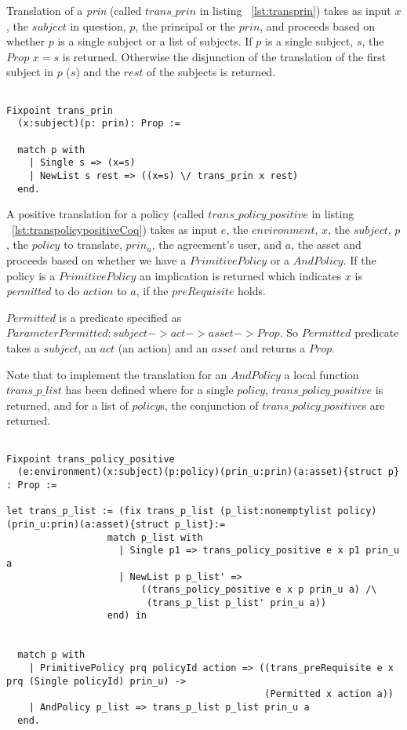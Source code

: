 Translation of a \emph{prin} (called $trans\_prin$ in listing ~\ref{lst:transprin}) takes as input $x$, the $subject$ in question, $p$, the principal or the $prin$,  and proceeds based on whether $p$ is a single subject or a list of subjects. If $p$ is a single subject, $s$, the $Prop$ $x=s$ is returned. Otherwise the disjunction of the translation of the first subject in $p$ ($s$) and the $rest$ of the subjects is returned.

\begin{lstlisting}

Fixpoint trans_prin
  (x:subject)(p: prin): Prop :=

  match p with
    | Single s => (x=s)
    | NewList s rest => ((x=s) \/ trans_prin x rest)
  end.
\end{lstlisting}


A positive translation for a policy (called $trans\_policy\_positive$ in listing ~\ref{lst:transpolicypositiveCoq}) takes as input $e$, the $environment$, $x$, the $subject$, $p$, the $policy$ to translate, $prin_{u}$, the agreement's user, and $a$, the asset and proceeds based on whether we have a $PrimitivePolicy$ or a $AndPolicy$. If the policy is a $PrimitivePolicy$ an implication is returned which indicates $x$ is \emph{permitted} to do $action$ to $a$, if the $preRequisite$ holds. 

$Permitted$ is a predicate specified as $Parameter Permitted : subject -> act -> asset -> Prop.$ So $Permitted$ predicate takes a $subject$, an $act$ (an action) and an $asset$ and returns a $Prop$. 

Note that to implement the translation for an $AndPolicy$ a local function $trans\_p\_list$ has been defined where for a single $policy$, $trans\_policy\_positive$ is returned, and for a list of $policy$s, the conjunction of $trans\_policy\_positive$s are returned.

\begin{lstlisting}

Fixpoint trans_policy_positive
  (e:environment)(x:subject)(p:policy)(prin_u:prin)(a:asset){struct p} : Prop :=

let trans_p_list := (fix trans_p_list (p_list:nonemptylist policy)(prin_u:prin)(a:asset){struct p_list}:=
                  match p_list with
                    | Single p1 => trans_policy_positive e x p1 prin_u a
                    | NewList p p_list' => 
                        ((trans_policy_positive e x p prin_u a) /\ 
                         (trans_p_list p_list' prin_u a))
                  end) in


  match p with
    | PrimitivePolicy prq policyId action => ((trans_preRequisite e x prq (Single policyId) prin_u) ->
                                              (Permitted x action a))
    | AndPolicy p_list => trans_p_list p_list prin_u a
  end.
\end{lstlisting}

